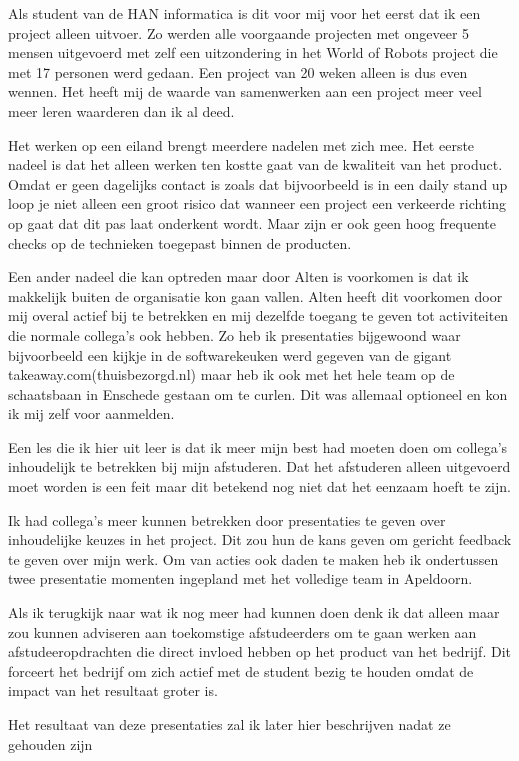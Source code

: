 \documentclass[a4paper, 11pt, oneside]{report}
\begin{document}
Als student van de HAN informatica is dit voor mij voor het eerst dat ik een project alleen uitvoer. 
Zo werden alle voorgaande projecten met ongeveer 5 mensen uitgevoerd met zelf een uitzondering in het World of Robots project die met 17 personen werd gedaan.
Een project van 20 weken alleen is dus even wennen.
Het heeft mij de waarde van samenwerken aan een project meer veel meer leren waarderen dan ik al deed. 

Het werken op een eiland brengt meerdere nadelen met zich mee.
Het eerste nadeel is dat het alleen werken ten kostte gaat van de kwaliteit van het product.
Omdat er geen dagelijks contact is zoals dat bijvoorbeeld is in een daily stand up loop je niet alleen een groot risico dat wanneer een project een verkeerde richting op gaat dat dit pas laat onderkent wordt. Maar zijn er ook geen hoog frequente checks op de technieken toegepast binnen de producten.

Een ander nadeel die kan optreden maar door Alten is voorkomen is dat ik makkelijk buiten de organisatie kon gaan vallen.
Alten heeft dit voorkomen door mij overal actief bij te betrekken en mij dezelfde toegang te geven tot activiteiten die normale collega's ook hebben. Zo heb ik presentaties bijgewoond waar bijvoorbeeld een kijkje in de softwarekeuken werd gegeven van de gigant takeaway.com(thuisbezorgd.nl) maar heb ik ook met het hele team op de schaatsbaan in Enschede gestaan om te curlen. Dit was allemaal optioneel en kon ik mij zelf voor aanmelden.

Een les die ik hier uit leer is dat ik meer mijn best had moeten doen om collega's inhoudelijk te betrekken bij mijn afstuderen. Dat het afstuderen alleen uitgevoerd moet worden is een feit maar dit betekend nog niet dat het eenzaam hoeft te zijn.

Ik had collega's meer kunnen betrekken door presentaties te geven over inhoudelijke keuzes in het project. Dit zou hun de kans geven om gericht feedback te geven over mijn werk. Om van acties ook daden te maken heb ik ondertussen twee presentatie momenten ingepland met het volledige team in Apeldoorn.

Als ik terugkijk naar wat ik nog meer had kunnen doen denk ik dat alleen maar zou kunnen adviseren aan toekomstige afstudeerders om te gaan werken aan afstudeeropdrachten die direct invloed hebben op het product van het bedrijf. Dit forceert het bedrijf om zich actief met de student bezig te houden omdat de impact van het resultaat groter is. 

Het resultaat van deze presentaties zal ik later hier beschrijven nadat ze gehouden zijn
\end{document}
